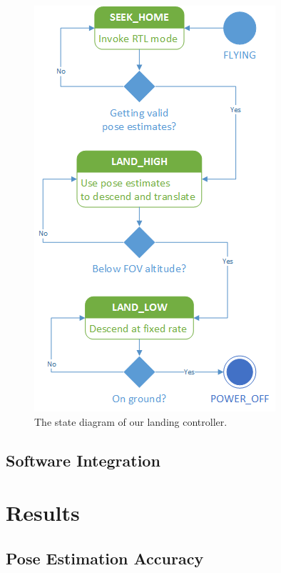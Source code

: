 \documentclass[10pt]{scrartcl} %
\begin{document}

\begin{figure}[h]
    \centering
    \includegraphics{images/statediagram.png}
    \caption{The state diagram of our landing controller.}
    \label{fig:statediagram}
\end{figure}

\subsection{Software Integration}


\section{Results}

\subsection{Pose Estimation Accuracy}

\end{document}
